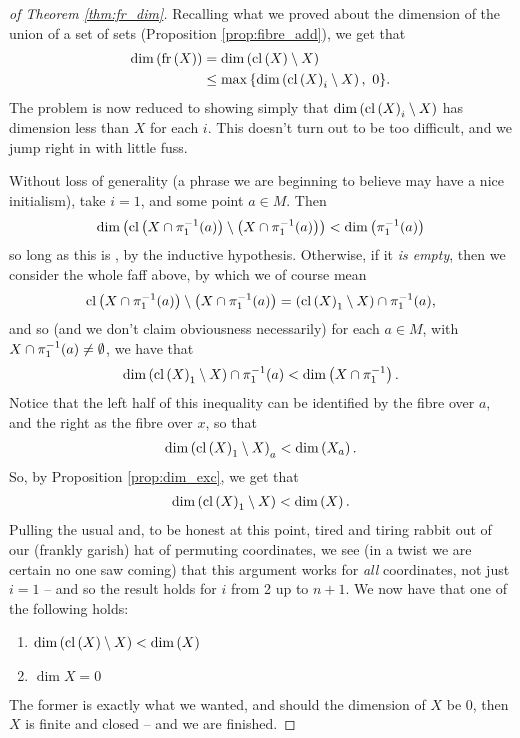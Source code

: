 \begin{proof}[of Theorem \ref{thm:fr_dim}]
    Recalling what we proved about the dimension of the union of a set of sets (Proposition \ref{prop:fibre_add}), we get that
      \begin{align*}
        \operatorname{dim}\left(\operatorname{fr}\left(X\right)\right) &= \operatorname{dim}\left(\operatorname{cl}\left(X\right) \setminus X\right)\\
                     &\leq \max{ \left\{ \operatorname{dim}\left(\operatorname{cl}\left(X\right)_i \setminus X\right), \ 0 \right\} }.
      \end{align*}
      The problem is now reduced to showing simply that $\operatorname{dim}\left(\operatorname{cl}\left(X\right)_i \setminus X\right)$ has dimension less than $X$ for each $i$. This doesn't turn out to be too difficult, and we jump right in with little fuss.

      Without loss of generality (a phrase we are beginning to believe may have a nice initialism), take $i = 1$, and some point $a \in M$. Then
        \begin{align*}
          \operatorname{dim}\left( \operatorname{cl}\left(X \cap \pi_1^{-1}(a)\right) \setminus \left( X \cap \pi_1^{-1}(a) \right) \right) < \operatorname{dim}\left(\pi_1^{-1}(a)\right)
        \end{align*}
      so long as this is \inhb, by the inductive hypothesis. Otherwise, if it \emph{is empty}, then we consider the whole faff above, by which we of course mean
        \begin{align*}
          \operatorname{cl}\left(X \cap \pi_1^{-1}(a)\right) \setminus \left( X \cap \pi_1^{-1}(a) \right) = \left( \operatorname{cl}\left(X\right)_1 \setminus X \right) \cap \pi_1^{-1}(a),
        \end{align*}
      and so (and we don't claim obviousness necessarily) for each $a \in M$, with $X \cap \pi_1^{-1}(a) \neq \emptyset$, we have that
        \begin{align*}
          \operatorname{dim}\left(\operatorname{cl}\left(X\right)_1 \setminus X\right) \cap \pi_1^{-1}(a) < \operatorname{dim}\left(X \cap \pi_1^{-1}\right).
        \end{align*}
      Notice that the left half of this inequality can be identified by the fibre over $a$, and the right as the fibre over $x$, so that
        \begin{align*}
          \operatorname{dim}\left(\operatorname{cl}\left(X\right)_1 \setminus X\right)_a < \operatorname{dim}\left(X_a\right).
        \end{align*}
      So, by Proposition \ref{prop:dim_exc}, we get that
        \begin{align*}
          \operatorname{dim}\left(\operatorname{cl}\left(X\right)_1 \setminus X\right) < \operatorname{dim}\left(X\right).
        \end{align*}
      Pulling the usual and, to be honest at this point, tired and tiring rabbit out of our (frankly garish) hat of permuting coordinates, we see (in a twist we are certain no one saw coming) that this argument works for \emph{all} coordinates, not just $i = 1$ -- and so the result holds for $i$ from 2 up to $n + 1$. We now have that one of the following holds:
        \begin{enumerate}
         \item $\operatorname{dim}\left(\operatorname{cl}\left(X\right) \setminus X\right) < \operatorname{dim}\left(X\right)$
         \item $\dim{X} = 0$
       \end{enumerate}
      The former is exactly what we wanted, and should the dimension of $X$ be 0, then $X$ is finite and closed -- and we are finished.
      \smartqed
\end{proof}

